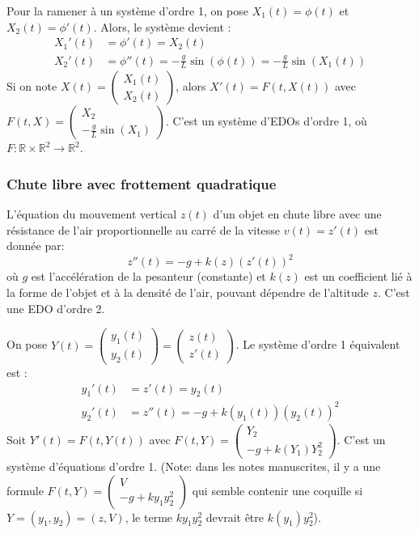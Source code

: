 Pour la ramener à un système d'ordre 1, on pose $X_1(t) = \phi(t)$ et $X_2(t) = \phi'(t)$.
Alors, le système devient :
\begin{align*}
X_1'(t) &= \phi'(t) = X_2(t) \\
X_2'(t) &= \phi''(t) = -\frac{g}{L} \sin(\phi(t)) = -\frac{g}{L} \sin(X_1(t))
\end{align*}
Si on note $X(t) = \begin{pmatrix} X_1(t) \\ X_2(t) \end{pmatrix}$, alors $X'(t) = F(t, X(t))$ avec $F(t, X) = \begin{pmatrix} X_2 \\ -\frac{g}{L} \sin(X_1) \end{pmatrix}$.
C'est un système d'EDOs d'ordre 1, où $F: \mathbb{R} \times \mathbb{R}^2 \to \mathbb{R}^2$.

\subsubsection{Chute libre avec frottement quadratique}
\label{sssec:chute_libre}
L'équation du mouvement vertical $z(t)$ d'un objet en chute libre avec une résistance de l'air proportionnelle au carré de la vitesse $v(t) = z'(t)$ est donnée par:
\[ z''(t) = -g + k(z) (z'(t))^2 \]
où $g$ est l'accélération de la pesanteur (constante) et $k(z)$ est un coefficient lié à la forme de l'objet et à la densité de l'air, pouvant dépendre de l'altitude $z$. C'est une EDO d'ordre 2.

On pose $Y(t) = \begin{pmatrix} y_1(t) \\ y_2(t) \end{pmatrix} = \begin{pmatrix} z(t) \\ z'(t) \end{pmatrix}$.
Le système d'ordre 1 équivalent est :
\begin{align*}
y_1'(t) &= z'(t) = y_2(t) \\
y_2'(t) &= z''(t) = -g + k(y_1(t)) (y_2(t))^2
\end{align*}
Soit $Y'(t) = F(t, Y(t))$ avec $F(t, Y) = \begin{pmatrix} Y_2 \\ -g + k(Y_1) Y_2^2 \end{pmatrix}$. C'est un système d'équations d'ordre 1.
(Note: dans les notes manuscrites, il y a une formule $F(t,Y) = \begin{pmatrix} V \\ -g + k y_1 y_2^2 \end{pmatrix}$ qui semble contenir une coquille si $Y=(y_1, y_2)=(z,V)$, le terme $k y_1 y_2^2$ devrait être $k(y_1) y_2^2$).

